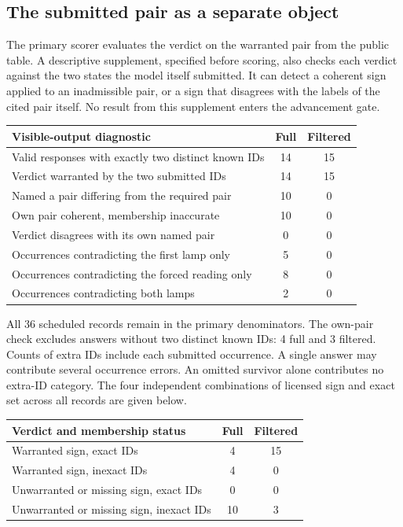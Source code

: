 \documentclass[12pt,letterpaper]{article}
\begin{document}
\subsection{The submitted pair as a separate object}

The primary scorer evaluates the verdict on the warranted pair from the public table. A descriptive supplement, specified before scoring, also checks each verdict against the two states the model itself submitted. It can detect a coherent sign applied to an inadmissible pair, or a sign that disagrees with the labels of the cited pair itself. No result from this supplement enters the advancement gate.

\begin{center}{\small\setlength{\tabcolsep}{4pt}\begin{tabularx}{\linewidth}{@{}Ycc@{}}\toprule
Visible-output diagnostic & Full & Filtered\\ \midrule
Valid responses with exactly two distinct known IDs & 14 & 15\\
Verdict warranted by the two submitted IDs & 14 & 15\\
Named a pair differing from the required pair & 10 & 0\\
Own pair coherent, membership inaccurate & 10 & 0\\
Verdict disagrees with its own named pair & 0 & 0\\
Occurrences contradicting the first lamp only & 5 & 0\\
Occurrences contradicting the forced reading only & 8 & 0\\
Occurrences contradicting both lamps & 2 & 0\\ \bottomrule\end{tabularx}}
\end{center}

All 36 scheduled records remain in the primary denominators. The own-pair check excludes answers without two distinct known IDs: 4 full and 3 filtered. Counts of extra IDs include each submitted occurrence. A single answer may contribute several occurrence errors. An omitted survivor alone contributes no extra-ID category. The four independent combinations of licensed sign and exact set across all records are given below.

\begin{center}{\small\setlength{\tabcolsep}{4pt}\begin{tabularx}{\linewidth}{@{}Ycc@{}}\toprule
Verdict and membership status & Full & Filtered\\ \midrule
Warranted sign, exact IDs & 4 & 15\\
Warranted sign, inexact IDs & 4 & 0\\
Unwarranted or missing sign, exact IDs & 0 & 0\\
Unwarranted or missing sign, inexact IDs & 10 & 3\\ \bottomrule\end{tabularx}}
\end{center}
\end{document}
